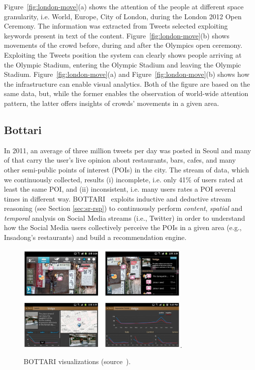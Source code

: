 Figure~\ref{fig:london-move}(a) shows the attention of the people at different space granularity, i.e. World, Europe, City of London, during the London 2012 Open Ceremony. The information was extracted from Tweets selected exploiting keywords present in text of the content.
Figure~\ref{fig:london-move}(b) shows movements of the crowd before, during and after the Olympics open ceremony. Exploiting the Tweets position the system can clearly shows people arriving at the Olympic Stadium, entering the Olympic Stadium and leaving the Olympic Stadium.
Figure~\ref{fig:london-move}(a) and Figure~\ref{fig:london-move}(b) shows how the infrastructure can enable visual analytics. 
Both of the figure are based on the same data, but, while the former enables the observation of world-wide attention pattern, the latter offers insights of crowds' movements in a given area.

\subsection{Bottari} \label{sec:uda-bottari}
In 2011, an average of three million tweets per day was posted in Seoul and many of that carry the user's live opinion about restaurants, bars, cafes, and many other semi-public points of interest (POIs) in the city. 
The stream of data, which we continuously collected, results (i) incomplete, i.e. only 41\% of users rated at least the same POI, and (ii) inconsistent, i.e. many users rates a POI several times in different way.
BOTTARI~\cite{DBLP:journals/ws/BalduiniCDVHLKT12} exploits inductive and deductive stream reasoning (see Section \ref{sec:sr-rsp}) to continuously perform \textit{content}, \textit{spatial} and \textit{temporal} analysis on Social Media streams (i.e., Twitter) in order to understand how the Social Media users collectively perceive the POIs in a given area (e.g., Insadong's restaurants) and build a recommendation engine.

\begin{figure}[t]
	\centering
	\includegraphics[width=0.75\textwidth]{img/bottari2.pdf}.
    \caption{BOTTARI visualizations (source~\cite{DBLP:conf/semweb/BalduiniVDTPC13}).}
    \label{fig:bottari-vis}
\end{figure}

